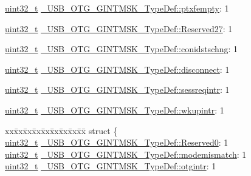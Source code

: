 \begin{DoxyCompactItemize}
\item 
\hyperlink{stdint_8h_a435d1572bf3f880d55459d9805097f62}{uint32\-\_\-t} \hyperlink{group___u_s_b___o_t_g___d_r_i_v_e_r_gaa333b78e682c36bf18392c4b0d5a9c6f}{\-\_\-\-U\-S\-B\-\_\-\-O\-T\-G\-\_\-\-G\-I\-N\-T\-M\-S\-K\-\_\-\-Type\-Def\-::ptxfempty}\-: 1
\item 
\hyperlink{stdint_8h_a435d1572bf3f880d55459d9805097f62}{uint32\-\_\-t} \hyperlink{group___u_s_b___o_t_g___d_r_i_v_e_r_gad99b5c001b27085480bb91a75d8a63df}{\-\_\-\-U\-S\-B\-\_\-\-O\-T\-G\-\_\-\-G\-I\-N\-T\-M\-S\-K\-\_\-\-Type\-Def\-::\-Reserved27}\-: 1
\item 
\hyperlink{stdint_8h_a435d1572bf3f880d55459d9805097f62}{uint32\-\_\-t} \hyperlink{group___u_s_b___o_t_g___d_r_i_v_e_r_ga4fcd5911c8b0577a0f7cdd626fb2cfb9}{\-\_\-\-U\-S\-B\-\_\-\-O\-T\-G\-\_\-\-G\-I\-N\-T\-M\-S\-K\-\_\-\-Type\-Def\-::conidstschng}\-: 1
\item 
\hyperlink{stdint_8h_a435d1572bf3f880d55459d9805097f62}{uint32\-\_\-t} \hyperlink{group___u_s_b___o_t_g___d_r_i_v_e_r_ga74931c2b48f366e97e11919d59e8af59}{\-\_\-\-U\-S\-B\-\_\-\-O\-T\-G\-\_\-\-G\-I\-N\-T\-M\-S\-K\-\_\-\-Type\-Def\-::disconnect}\-: 1
\item 
\hyperlink{stdint_8h_a435d1572bf3f880d55459d9805097f62}{uint32\-\_\-t} \hyperlink{group___u_s_b___o_t_g___d_r_i_v_e_r_ga66a6d3b64dd0fe06a69a20da548ffa12}{\-\_\-\-U\-S\-B\-\_\-\-O\-T\-G\-\_\-\-G\-I\-N\-T\-M\-S\-K\-\_\-\-Type\-Def\-::sessreqintr}\-: 1
\item 
\hyperlink{stdint_8h_a435d1572bf3f880d55459d9805097f62}{uint32\-\_\-t} \hyperlink{group___u_s_b___o_t_g___d_r_i_v_e_r_ga10f52c46665ba27efd6a1ef98cb58fd7}{\-\_\-\-U\-S\-B\-\_\-\-O\-T\-G\-\_\-\-G\-I\-N\-T\-M\-S\-K\-\_\-\-Type\-Def\-::wkupintr}\-: 1
\item 
\begin{tabbing}
xx\=xx\=xx\=xx\=xx\=xx\=xx\=xx\=xx\=\kill
struct \{\\
\>\hyperlink{stdint_8h_a435d1572bf3f880d55459d9805097f62}{uint32\_t} \hyperlink{group___u_s_b___o_t_g___d_r_i_v_e_r_gae70b4c3c3e4cd67e47bffb922442b1d1}{\_USB\_OTG\_GINTMSK\_TypeDef::Reserved0}: 1\\
\>\hyperlink{stdint_8h_a435d1572bf3f880d55459d9805097f62}{uint32\_t} \hyperlink{group___u_s_b___o_t_g___d_r_i_v_e_r_ga77714304af3ece5bbc8fcd3ba715adc9}{\_USB\_OTG\_GINTMSK\_TypeDef::modemismatch}: 1\\
\>\hyperlink{stdint_8h_a435d1572bf3f880d55459d9805097f62}{uint32\_t} \hyperlink{group___u_s_b___o_t_g___d_r_i_v_e_r_ga148fbc7761867493dd8af7b29cc5e764}{\_USB\_OTG\_GINTMSK\_TypeDef::otgintr}: 1\\

\end{tabbing}
\end{DoxyCompactItemize}
